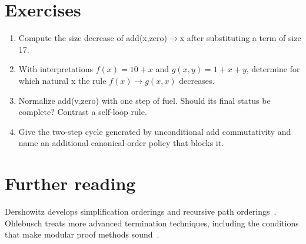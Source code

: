 \section{Exercises}
\label{sec:ch83-exercises}
\begin{enumerate}
\item\label{ex:ch83-size} Compute the size decrease of add(x,zero)$\to$x after substituting a term of size 17.
\item\label{ex:ch83-duplicate} With interpretations $f(x)=10+x$ and $g(x,y)=1+x+y$, determine for which natural x the rule $f(x)\to g(x,x)$ decreases.
\item\label{ex:ch83-fuel} Normalize add(v,zero) with one step of fuel.
Should its final status be complete? Contrast a self-loop rule.
\item\label{ex:ch83-commute} Give the two-step cycle generated by unconditional add commutativity and name an additional canonical-order policy that blocks it.
\end{enumerate}

\section{Further reading}
\label{sec:ch83-reading}
Dershowitz develops simplification orderings and recursive path orderings~\cite{dershowitz-1982-orderings}.
Ohlebusch treats more advanced termination techniques, including the conditions that make modular proof methods sound~\cite{ohlebusch-2002-rewriting}.
